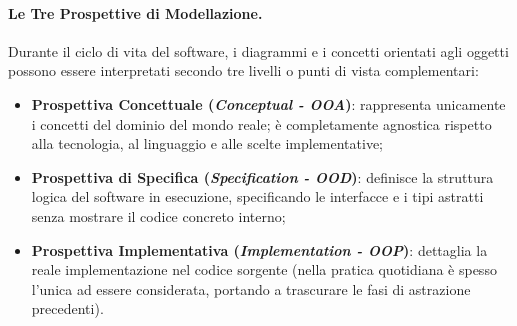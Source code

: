 \documentclass[12pt]{extarticle}
\begin{document}
\paragraph{Le Tre Prospettive di Modellazione.}
Durante il ciclo di vita del software, i diagrammi e i concetti orientati agli oggetti possono essere interpretati secondo tre livelli o punti di vista complementari:
\begin{itemize}
    \item \textbf{Prospettiva Concettuale (\textit{Conceptual - OOA})}: rappresenta unicamente i concetti del dominio del mondo reale; è completamente agnostica rispetto alla tecnologia, al linguaggio e alle scelte implementative;
    \item \textbf{Prospettiva di Specifica (\textit{Specification - OOD})}: definisce la struttura logica del software in esecuzione, specificando le interfacce e i tipi astratti senza mostrare il codice concreto interno;
    \item \textbf{Prospettiva Implementativa (\textit{Implementation - OOP})}: dettaglia la reale implementazione nel codice sorgente (nella pratica quotidiana è spesso l'unica ad essere considerata, portando a trascurare le fasi di astrazione precedenti).
\end{itemize}

\begin{figure}[htbp]
    \centering
{}
    \label{fig:three_perspectives}
\end{figure}
\end{document}
